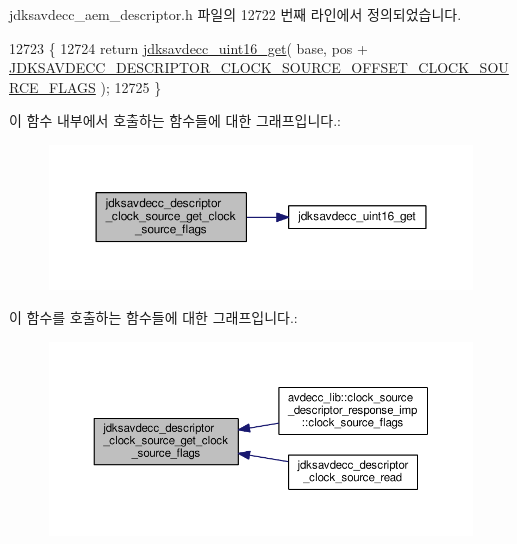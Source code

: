 jdksavdecc\+\_\+aem\+\_\+descriptor.\+h 파일의 12722 번째 라인에서 정의되었습니다.


\begin{DoxyCode}
12723 \{
12724     \textcolor{keywordflow}{return} \hyperlink{group__endian_ga3fbbbc20be954aa61e039872965b0dc9}{jdksavdecc\_uint16\_get}( base, pos + 
      \hyperlink{group__descriptor__clock__source_gaf84868c1aaeff0338fd8e36baf02855b}{JDKSAVDECC\_DESCRIPTOR\_CLOCK\_SOURCE\_OFFSET\_CLOCK\_SOURCE\_FLAGS}
       );
12725 \}
\end{DoxyCode}


이 함수 내부에서 호출하는 함수들에 대한 그래프입니다.\+:
\nopagebreak
\begin{figure}[H]
\begin{center}
\leavevmode
\includegraphics[width=350pt]{group__descriptor__clock__source_ga446687533424c37008df2804641825cd_cgraph}
\end{center}
\end{figure}




이 함수를 호출하는 함수들에 대한 그래프입니다.\+:
\nopagebreak
\begin{figure}[H]
\begin{center}
\leavevmode
\includegraphics[width=350pt]{group__descriptor__clock__source_ga446687533424c37008df2804641825cd_icgraph}
\end{center}
\end{figure}



